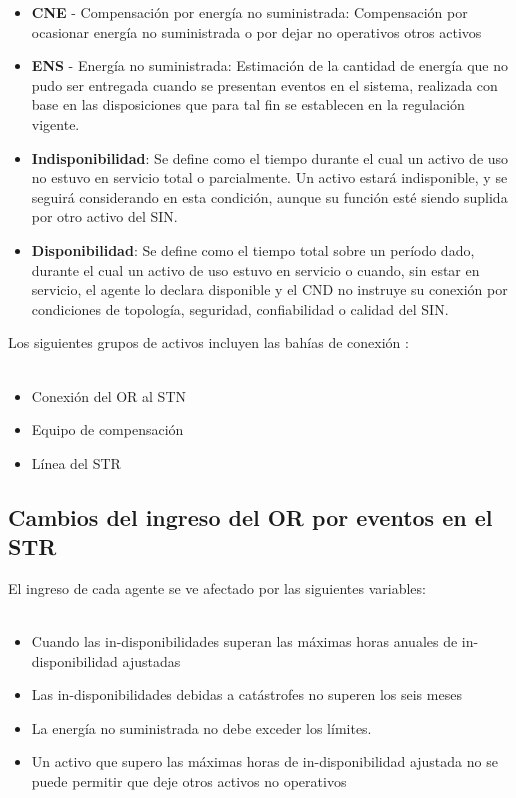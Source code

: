 \documentclass[a5paper]{book}%
\begin{document}
\begin{itemize}
\item  \textbf{CNE} - Compensación por energía no suministrada: Compensación por ocasionar energía no suministrada o por dejar no operativos otros activos
\item \textbf{ENS} - Energía no suministrada: Estimación de la cantidad de energía que no pudo ser entregada cuando se presentan eventos en el sistema, realizada con base en las disposiciones que para tal fin se establecen en la regulación vigente.
\item \textbf{Indisponibilidad}: Se define como el tiempo durante el cual un activo de uso no estuvo en servicio total o parcialmente. Un activo estará indisponible, y se seguirá considerando en esta condición, aunque su función esté siendo suplida por otro activo del SIN.
\item \textbf{Disponibilidad}: Se define como el tiempo total sobre un período dado, durante el cual un activo de uso estuvo en servicio o cuando, sin estar en servicio, el agente lo declara disponible y el CND no instruye su conexión por condiciones de topología, seguridad, confiabilidad o calidad del SIN.
\end{itemize}


 Los siguientes  grupos de activos incluyen las bahías de conexión :\\\\
  \begin{itemize}
  \item Conexión del OR al STN
  \item Equipo de compensación
  \item Línea del \ac{STR}
  \end{itemize}

\subsection{Cambios del ingreso del OR por eventos en el STR}

El ingreso de cada agente se ve afectado por las siguientes variables:\\\\

\begin{itemize}
\item Cuando las in-disponibilidades superan las máximas horas anuales de in-disponibilidad ajustadas
\item Las in-disponibilidades debidas a catástrofes no superen los seis meses
\item La energía no suministrada no debe exceder los límites.
\item Un activo que supero las máximas horas de in-disponibilidad ajustada no se puede permitir que deje otros activos no operativos
\end{itemize}
\end{document}
